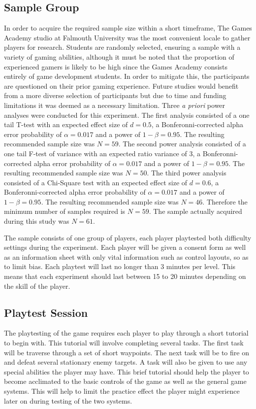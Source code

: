 \documentclass[journal]{IEEEtran}
\begin{document}
\subsection{Sample Group}
In order to acquire the required sample size within a short timeframe, The Games Academy studio at Falmouth University was the most convenient locale to gather players for research. Students are randomly selected, ensuring a sample with a variety of gaming abilities, although it must be noted that the proportion of experienced gamers is likely to be high since the Games Academy consists entirely of game development students. In order to mitigate this, the participants are questioned on their prior gaming experience. Future studies would benefit from a more diverse selection of participants but due to time and funding limitations it was deemed as a necessary limitation. Three \textit{a priori} power analyses were conducted for this experiment. The first analysis consisted of a one tail T-test with an expected effect size of $d = 0.5$, a Bonferonni-corrected \cite{weisstein2004bonferroni} alpha error probability of $\alpha = 0.017$ and a power of $1 - \beta = 0.95$. The resulting recommended sample size was $N = 59$. 
The second power analysis consisted of a one tail F-test of variance with an expected ratio variance of 3, a Bonferonni-corrected  alpha error probability of $\alpha = 0.017$ and a power of $1 - \beta = 0.95$. The resulting recommended sample size was $N = 50$.
The third power analysis consisted of a Chi-Square test with an expected effect size of $d = 0.6$, a Bonferonni-corrected alpha error probability of $\alpha = 0.017$ and a power of $1 - \beta = 0.95$. The resulting recommended sample size was $N = 46$. Therefore the minimum number of samples required is $N = 59$. The sample actually acquired during this study was $N = 61$. 

The sample consists of one group of players, each player playtested both difficulty settings during the experiment. Each player will be given a consent form as well as an information sheet with only vital information such as control layouts, so as to limit bias. Each playtest will last no longer than 3 minutes per level. This means that each experiment should last between 15 to 20 minutes depending on the skill of the player.

\subsection{Playtest Session}
The playtesting of the game requires each player to play through a short tutorial to begin with.  This tutorial will involve completing several tasks. The first task will be traverse through a set of short waypoints. The next task will be to fire on and defeat several stationary enemy targets. A task will also be given to use any special abilities the player may have. This brief tutorial should help the player to become acclimated to the basic controls of the game as well as the general game systems. This will help to limit the practice effect the player might experience later on during testing of the two systems. 
\end{document}
